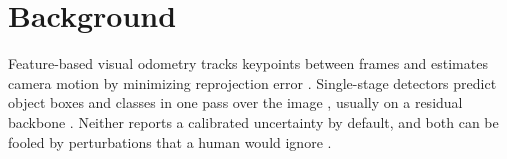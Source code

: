\chapter{Background}
\label{ch:background}

Feature-based visual odometry tracks keypoints between frames and estimates camera motion by
minimizing reprojection error \citep{murartal2015}. Single-stage detectors predict object
boxes and classes in one pass over the image \citep{redmon2016}, usually on a residual
backbone \citep{he2016}. Neither reports a calibrated uncertainty by default, and both can be
fooled by perturbations that a human would ignore \citep{goodfellow2015}.

